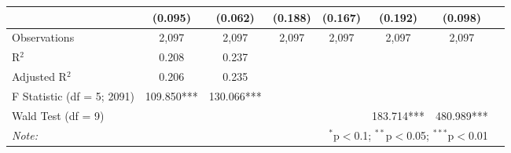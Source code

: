 \documentclass[lang=cn,11pt,authoryear,UTF-8]{elegantpaper}
\begin{document}
\begin{table}[htbp]
\begin{tabular}{lccccccc}
        & (0.095) & (0.062) & (0.188) & (0.167) & (0.192) & (0.098) \\ 
    \midrule
    Observations & 2,097 & 2,097 & 2,097 &  2,097 & 2,097 & 2,097 \\ 
    R$^{2}$ & 0.208 & 0.237 &  &  &  &  \\ 
    Adjusted R$^{2}$ & 0.206 & 0.235 &  &  &  &  \\ 
    F Statistic (df = 5; 2091) & 109.850***& 130.066*** &  &  &  &  \\ 
    Wald Test (df = 9) &  &  &  &  & 183.714*** & 480.989*** \\
    \bottomrule
    \textit{Note:}  & \multicolumn{6}{r}{$^{*}$p$<$0.1; $^{**}$p$<$0.05; $^{***}$p$<$0.01} \\
    \end{tabular}%
  \label{tab:volreg}%
\end{table}%
\end{document}
